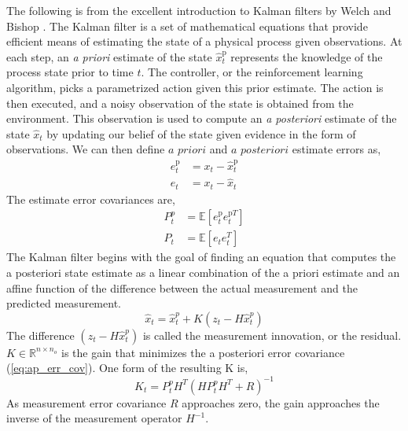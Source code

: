 \documentclass{article}
\begin{document}
The following is from the excellent introduction to Kalman filters by Welch and Bishop \cite{welch1995introduction}. The Kalman filter is a set of mathematical equations that provide efficient means of estimating the state of a physical process given observations. At each step, an \textit{a priori} estimate of the state $\hat{x}_{t}^{\text{p}}$ represents the knowledge of the process state prior to time $t$. The controller, or the reinforcement learning algorithm, picks a parametrized action given this prior estimate. The action is then executed, and a noisy observation of the state is obtained from the environment. This observation is used to compute an \textit{a posteriori} estimate of the state $\hat{x}_{t}$ by updating our belief of the state given evidence in the form of observations. We can then define $\textit{a priori}$ and $\textit{a posteriori}$ estimate errors as,
\begin{align*}
	e^{\text{p}}_t &= x_t - \hat{x}_{t}^{\text{p}} \\
	e_t &= x_t - \hat{x}_{t} 
\end{align*}
The estimate error covariances are,
\begin{align}
	P^p_t &= \mathbb{E}\left[e^{\text{p}}_t e^{\text{p}T}_t \right]  \\
	P_t &= \mathbb{E}\left[e_t e_t^{T} \right] \label{eq:ap_err_cov}
\end{align}
The Kalman filter begins with the goal of finding an equation that computes the a posteriori state estimate as a linear combination of the a priori estimate and an affine function of the difference between the actual measurement and the predicted measurement.
\begin{equation}
	\hat{x}_t = \hat{x}_t^p + K(z_t - H\hat{x}_t^p)
	\label{eq:ap}
\end{equation}
The difference $(z_t - H\hat{x}_t^p)$ is called the measurement innovation, or the residual.  $K \in \mathbb{R}^{n \times n_o}$ is the gain that minimizes the a posteriori error covariance (\ref{eq:ap_err_cov}). One form of the resulting K is, \cite{maybeck1982stochastic} 
\begin{equation}
	K_t = P_t^p H^T(HP_t^pH^T + R)^{-1}
	\label{eq:k_gain}
\end{equation}
As measurement error covariance $R$ approaches zero, the gain approaches the inverse of the measurement operator $H^{-1}$. 
\end{document}
